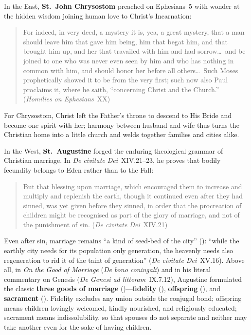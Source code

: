 In the East, \textbf{St.~John Chrysostom} preached on Ephesians~5 with wonder at the hidden wisdom joining human love to Christ's Incarnation:
\begin{quotation}
For indeed, in very deed, a mystery it is, yea, a great mystery, that a man should leave him that gave him being, him that begat him, and that brought him up, and her that travailed with him and had sorrow\ldots\ and be joined to one who was never even seen by him and who has nothing in common with him, and should honor her before all others\ldots\ Such Moses prophetically showed it to be from the very first; such now also Paul proclaims it, where he saith, ``concerning Christ and the Church.'' (\emph{Homilies on Ephesians}~XX)
\end{quotation}
For Chrysostom, Christ left the Father's throne to descend to His Bride and become one spirit with her; harmony between husband and wife thus turns the Christian home into a little church and welds together families and cities alike.

In the West, \textbf{St.~Augustine} forged the enduring theological grammar of Christian marriage. In \emph{De civitate Dei}~XIV.21--23, he proves that bodily fecundity belongs to Eden rather than to the Fall:
\begin{quotation}
But that blessing upon marriage, which encouraged them to increase and multiply and replenish the earth, though it continued even after they had sinned, was yet given before they sinned, in order that the procreation of children might be recognised as part of the glory of marriage, and not of the punishment of sin. (\emph{De civitate Dei}~XIV.21)
\end{quotation}
Even after sin, marriage remains ``a kind of seed-bed of the city'' (): ``while the earthly city needs for its population only generation, the heavenly needs also regeneration to rid it of the taint of generation'' (\emph{De civitate Dei}~XV.16). Above all, in \emph{On the Good of Marriage} (\emph{De bono coniugali}) and in his literal commentary on Genesis (\emph{De Genesi ad litteram}~IX.7.12), Augustine formulated the classic \textbf{three goods of marriage} ()---\textbf{fidelity} (), \textbf{offspring} (), and \textbf{sacrament} (). Fidelity excludes any union outside the conjugal bond; offspring means children lovingly welcomed, kindly nourished, and religiously educated; sacrament means indissolubility, so that spouses do not separate and neither may take another even for the sake of having children.


